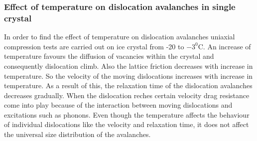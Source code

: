 \documentclass[a4paper,12pt]{article}
\begin{document}
\subsubsection{Effect of temperature on dislocation avalanches in single crystal}
\indent\indent In order to find the effect of temperature on dislocation avalanches uniaxial compression tests are carried out on ice crystal from -20 to $ -3^0 $C. An increase of temperature favours the diffusion of vacancies within the crystal and consequently dislocation climb. Also the lattice friction decreases with increase in temperature. So the velocity of the moving dislocations increases with increase in temperature. As a result of this, the relaxation time of the dislocation avalanches decreases gradually. When the dislocation reches certain velocity drag resistance come into play because of the interaction between moving dislocations and excitations such as phonons. Even though the temperature affects the behaviour of individual dislocations like the velocity and relaxation time, it does not affect the universal size distribution of the avalanches.
\newpage
\end{document}
